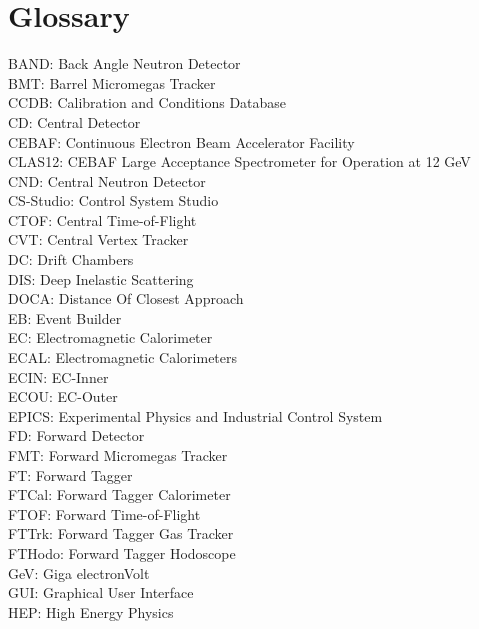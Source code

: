 \section*{Glossary}
{\setlength{\parskip}{0cm}
    BAND:      Back Angle Neutron Detector \\
    BMT:       Barrel Micromegas Tracker \\
    CCDB:      Calibration and Conditions Database \\
    CD:        Central Detector \\
    CEBAF:     Continuous Electron Beam Accelerator Facility \\
    CLAS12:    CEBAF Large Acceptance Spectrometer for Operation at 12 GeV \\
    CND:       Central Neutron Detector \\
    CS-Studio: Control System Studio \\
    CTOF:      Central Time-of-Flight \\
    CVT:       Central Vertex Tracker \\
    DC:        Drift Chambers \\
    DIS:       Deep Inelastic Scattering \\
    DOCA:      Distance Of Closest Approach \\
    EB:        Event Builder \\
    EC:        Electromagnetic Calorimeter \\
    ECAL:      Electromagnetic Calorimeters \\
    ECIN:      EC-Inner \\
    ECOU:      EC-Outer \\
    EPICS:     Experimental Physics and Industrial Control System \\
    FD:        Forward Detector \\
    FMT:       Forward Micromegas Tracker \\
    FT:        Forward Tagger \\
    FTCal:     Forward Tagger Calorimeter \\
    FTOF:      Forward Time-of-Flight \\
    FTTrk:     Forward Tagger Gas Tracker \\
    FTHodo:    Forward Tagger Hodoscope \\
    GeV:       Giga electronVolt \\
    GUI:       Graphical User Interface \\
    HEP:       High Energy Physics \\
}
